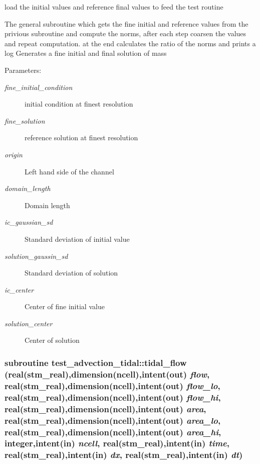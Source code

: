 load the initial values and reference final values to feed the test routine 

The general subroutine which gets the fine initial and reference values from the privious subroutine and compute the norms, after each step coarsen the values and repeat computation. at the end calculates the ratio of the norms and prints a log Generates a fine initial and final solution of mass \begin{Desc}
\item[Parameters:]
\begin{description}
\item[{\em fine\_\-initial\_\-condition}]initial condition at finest resolution\item[{\em fine\_\-solution}]reference solution at finest resolution\item[{\em origin}]Left hand side of the channel\item[{\em domain\_\-length}]Domain length\item[{\em ic\_\-gaussian\_\-sd}]Standard deviation of initial value\item[{\em solution\_\-gaussin\_\-sd}]Standard deviation of solution \item[{\em ic\_\-center}]Center of fine initial value\item[{\em solution\_\-center}]Center of solution \end{description}
\end{Desc}
\hypertarget{a00075_a641e8962260d8ad121308cc9b47f0ba}{
\subsubsection[{tidal\_\-flow}]{\setlength{\rightskip}{0pt plus 5cm}subroutine test\_\-advection\_\-tidal::tidal\_\-flow (real(stm\_\-real),dimension(ncell),intent(out) {\em flow}, \/  real(stm\_\-real),dimension(ncell),intent(out) {\em flow\_\-lo}, \/  real(stm\_\-real),dimension(ncell),intent(out) {\em flow\_\-hi}, \/  real(stm\_\-real),dimension(ncell),intent(out) {\em area}, \/  real(stm\_\-real),dimension(ncell),intent(out) {\em area\_\-lo}, \/  real(stm\_\-real),dimension(ncell),intent(out) {\em area\_\-hi}, \/  integer,intent(in) {\em ncell}, \/  real(stm\_\-real),intent(in) {\em time}, \/  real(stm\_\-real),intent(in) {\em dx}, \/  real(stm\_\-real),intent(in) {\em dt})}}
\label{a00075_a641e8962260d8ad121308cc9b47f0ba}


